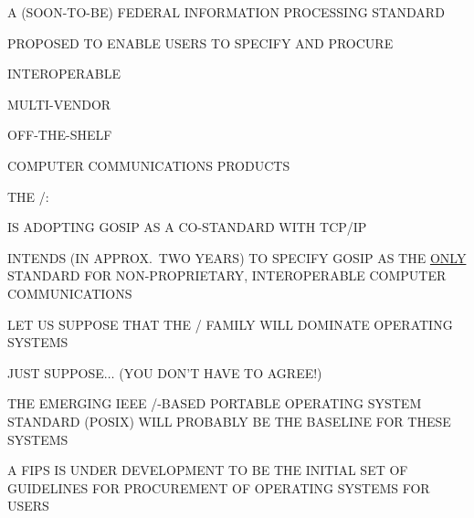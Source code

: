 \begin{bwslide}

\begin{nrtc}
\item	A (SOON-TO-BE) FEDERAL INFORMATION PROCESSING STANDARD

\item	PROPOSED TO ENABLE USERS TO SPECIFY AND PROCURE
	\begin{nrtc}
	\item	INTEROPERABLE

	\item	MULTI-VENDOR

	\item	OFF-THE-SHELF
	\end{nrtc}
	COMPUTER COMMUNICATIONS PRODUCTS

\item	THE \dod/:
    \begin{nrtc}
    \item	IS ADOPTING GOSIP AS A CO-STANDARD WITH TCP/IP

    \item	INTENDS (IN APPROX.~TWO YEARS) TO SPECIFY GOSIP AS THE 
		\underline{ONLY} STANDARD FOR NON-PROPRIETARY, INTEROPERABLE
		COMPUTER COMMUNICATIONS
    \end{nrtc}
\end{nrtc}
\end{bwslide}


\begin{bwslide}

\begin{nrtc}
\item	LET US SUPPOSE THAT THE \unix/ FAMILY WILL DOMINATE OPERATING SYSTEMS
    \begin{nrtc}
    \item	JUST SUPPOSE$\ldots$ (YOU DON'T HAVE TO AGREE!)
    \end{nrtc}

\item	THE EMERGING IEEE \unix/-BASED PORTABLE OPERATING SYSTEM
	STANDARD (POSIX) WILL PROBABLY BE THE BASELINE FOR THESE SYSTEMS

\item	A FIPS IS UNDER DEVELOPMENT TO BE THE INITIAL SET OF GUIDELINES FOR
	PROCUREMENT OF OPERATING SYSTEMS FOR USERS
\end{nrtc}
\end{bwslide}


